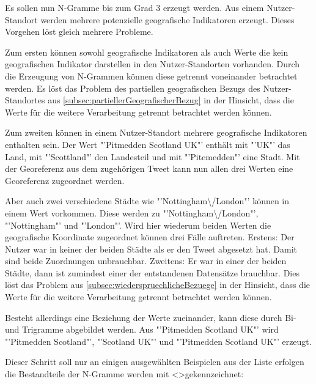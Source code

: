 				Es sollen nun N-Gramme bis zum Grad 3 erzeugt werden. 
				Aus einem Nutzer-Standort werden mehrere potenzielle geografische Indikatoren erzeugt.
				Dieses Vorgehen löst gleich mehrere Probleme.

				Zum ersten können sowohl geografische Indikatoren als auch Werte die kein geografischen Indikator darstellen in den Nutzer-Standorten vorhanden.
				Durch die Erzeugung von N-Grammen können diese getrennt voneinander betrachtet werden.
				Es löst das Problem des partiellen geografischen Bezugs des Nutzer-Standortes aus \ref{subsec:partiellerGeografischerBezug} in der Hinsicht, dass die Werte für die weitere Verarbeitung getrennt betrachtet werden können.

				Zum zweiten können in einem Nutzer-Standort mehrere geografische Indikatoren enthalten sein.  
				Der Wert "'Pitmedden Scotland UK"' enthält mit "'UK"' das Land, mit "'Scottland"' den Landesteil und mit "'Pitemedden"' eine Stadt. 
				Mit der Georeferenz aus dem zugehörigen Tweet kann nun allen drei Werten eine Georeferenz zugeordnet werden.

				Aber auch zwei verschiedene Städte wie "'Nottingham\textbackslash/London"' können in einem Wert vorkommen.
				Diese werden zu "'Nottingham\textbackslash/London"', "'Nottingham"' und "'London"'.
				Wird hier wiederum beiden Werten die geografische Koordinate zugeordnet können drei Fälle auftreten.
				Erstens: Der Nutzer war in keiner der beiden Städte als er den Tweet abgesetzt hat. 
				Damit sind beide Zuordnungen unbrauchbar.
				Zweitens: Er war in einer der beiden Städte, dann ist zumindest einer der entstandenen Datensätze brauchbar.
				Dies löst das Problem aus \ref{subsec:wiederspruechlicheBezuege} in der Hinsicht, dass die Werte für die weitere Verarbeitung getrennt betrachtet werden können.

				Besteht allerdings eine Beziehung der Werte zueinander, kann diese durch Bi- und Trigramme abgebildet werden.
				Aus "'Pitmedden Scotland UK"' wird "'Pitmedden Scotland"', "'Scotland UK"' und "'Pitmedden Scotland UK"' erzeugt.

				Dieser Schritt soll nur an einigen ausgewählten Beispielen aus der Liste erfolgen die Bestandteile der N-Gramme werden mit \textless \textgreater gekennzeichnet:

